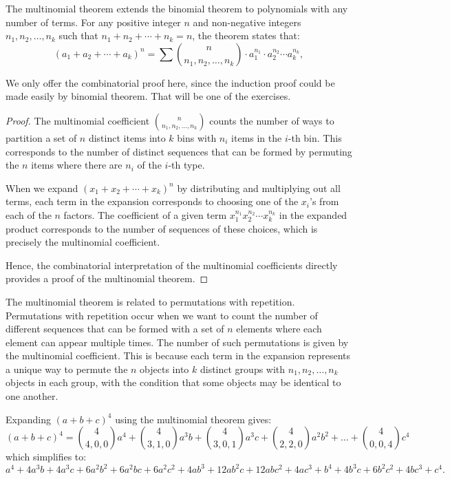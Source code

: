         \begin{definition}
            The multinomial theorem extends the binomial theorem to polynomials with any number of terms. For any positive integer $n$ and non-negative integers $n_1, n_2, \ldots, n_k$ such that $n_1 + n_2 + \cdots + n_k = n$, the theorem states that:
            \[
            (a_1 + a_2 + \cdots + a_k)^n = \sum \binom{n}{n_1, n_2, \ldots, n_k} \cdot a_1^{n_1} \cdot a_2^{n_2} \cdots a_k^{n_k},
            \]
        \end{definition}
        We only offer the combinatorial proof here, since the induction proof could be made easily by binomial
        theorem. That will be one of the exercises.
        \begin{proof}
            The multinomial coefficient $\binom{n}{n_1, n_2, \ldots, n_k}$ counts the number of ways to partition a set of $n$ distinct items into $k$ bins with $n_i$ items in the $i$-th bin. This corresponds to the number of distinct sequences that can be formed by permuting the $n$ items where there are $n_i$ of the $i$-th type.

            When we expand $(x_1 + x_2 + \cdots + x_k)^n$ by distributing and multiplying out all terms, each term in the expansion corresponds to choosing one of the $x_i$'s from each of the $n$ factors. The coefficient of a given term $x_1^{n_1} x_2^{n_2} \cdots x_k^{n_k}$ in the expanded product corresponds to the number of sequences of these choices, which is precisely the multinomial coefficient.

            Hence, the combinatorial interpretation of the multinomial coefficients directly provides a proof of the multinomial theorem.

        \end{proof}    
        The multinomial theorem is related to permutations with repetition. Permutations with repetition occur when we want to count the number of different sequences that can be formed with a set of $n$ elements where each element can appear multiple times. The number of such permutations is given by the multinomial coefficient. This is because each term in the expansion represents a unique way to permute the $n$ objects into $k$ distinct groups with $n_1, n_2, \ldots, n_k$ objects in each group, with the condition that some objects may be identical to one another.
        
        \begin{example}
            Expanding $(a + b + c)^4$ using the multinomial theorem gives:
            \[
            (a + b + c)^4 = \binom{4}{4,0,0}a^4 + \binom{4}{3,1,0}a^3b + \binom{4}{3,0,1}a^3c + \binom{4}{2,2,0}a^2b^2 + \ldots + \binom{4}{0,0,4}c^4
            \]
            which simplifies to:
            $
            a^4 + 4a^3b + 4a^3c + 6a^2b^2 + 6a^2bc + 6a^2c^2 + 4ab^3 + 12ab^2c + 12abc^2 + 4ac^3 + b^4 + 4b^3c + 6b^2c^2 + 4bc^3 + c^4.
            $
        \end{example}
            


